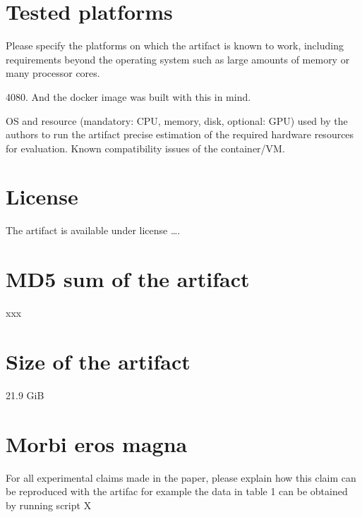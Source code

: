 \documentclass[a4paper,UKenglish]{darts-v2021}
\newenvironment{platforms}{\section{Tested platforms}}{}
\newcommand{\license}[1]{{\section{License}#1}}
\newcommand{\mdsum}[1]{{\section{MD5 sum of the artifact}#1}}
\newcommand{\artifactsize}[1]{{\section{Size of the artifact}#1}}
\begin{document}
\begin{platforms}
Please specify the platforms on which the artifact is known to
work, including requirements beyond the operating system such as large
amounts of memory or many processor cores.

4080. And the docker image was built with this in mind. 

OS and resource (mandatory: CPU, memory, disk, optional: GPU) used by the authors to run the artifact
precise estimation of the required hardware resources for evaluation.
Known compatibility issues of the container/VM.
\end{platforms}

\license{The artifact is available under license \dots.}

\mdsum{xxx}

\artifactsize{21.9 GiB}

\appendix
\section{Morbi eros magna}
For all experimental claims made in the paper, please explain how this claim can be reproduced with the artifac
for example the data in table 1 can be obtained by running script X





% 

\end{document}
